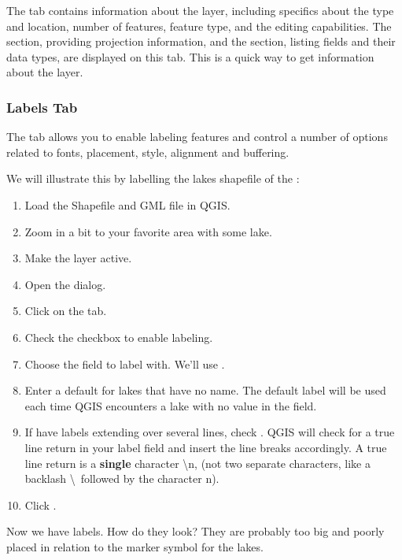 The  tab contains information about the layer, including specifics
about the type and location, number of features, feature type, and the editing
capabilities. The  section, providing 
projection information, and the  section,
listing fields and their data types, are displayed 
on this tab. This is a quick way to get information about the layer.

\subsubsection{Labels Tab}

The  tab allows you to enable labeling features and control a number of
options related to fonts, placement, style, alignment and buffering.

We will illustrate this by labelling the lakes shapefile of the
:

\begin{enumerate}
\item Load the Shapefile  and GML file  in QGIS.
\item Zoom in a bit to your favorite area with some lake.
\item Make the  layer active.
\item Open the  dialog.
\item Click on the  tab.
\item Check the  checkbox to enable labeling.
\item Choose the field to label with. 
  We'll use .
\item Enter a default for lakes that have no name. The default label will be
  used each time QGIS encounters a lake with no value in the  field.
\item If have labels extending over several lines, check . 
QGIS will check for a true line return in your label field and insert the line breaks accordingly.
A true line return is a \textbf{single} character \textbackslash n, 
(not two separate characters, like a backlash \textbackslash ~followed by the character n).
\item Click .
\end{enumerate} 

Now we have labels. How do they look? They are probably too big and poorly
placed in relation to the marker symbol for the lakes.


